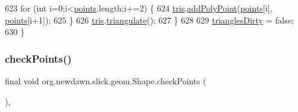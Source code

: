 \begin{DoxyCode}
623             \textcolor{keywordflow}{for} (\textcolor{keywordtype}{int} i=0;i<\mbox{\hyperlink{classorg_1_1newdawn_1_1slick_1_1geom_1_1_shape_a8b4d4058734bbb3b96072e470b92aa37}{points}}.length;i+=2) \{
624                 \mbox{\hyperlink{classorg_1_1newdawn_1_1slick_1_1geom_1_1_shape_abd907aa2c7a270db435ed15ce6d090da}{tris}}.\mbox{\hyperlink{interfaceorg_1_1newdawn_1_1slick_1_1geom_1_1_triangulator_a32b11eccb582c7f4993a944df0b1db65}{addPolyPoint}}(\mbox{\hyperlink{classorg_1_1newdawn_1_1slick_1_1geom_1_1_shape_a8b4d4058734bbb3b96072e470b92aa37}{points}}[i], \mbox{\hyperlink{classorg_1_1newdawn_1_1slick_1_1geom_1_1_shape_a8b4d4058734bbb3b96072e470b92aa37}{points}}[i+1]);
625             \}
626             \mbox{\hyperlink{classorg_1_1newdawn_1_1slick_1_1geom_1_1_shape_abd907aa2c7a270db435ed15ce6d090da}{tris}}.\mbox{\hyperlink{interfaceorg_1_1newdawn_1_1slick_1_1geom_1_1_triangulator_a7c7ce8f59679b6c759a1e3d15ec4ee92}{triangulate}}();
627         \}
628         
629         \mbox{\hyperlink{classorg_1_1newdawn_1_1slick_1_1geom_1_1_shape_a9300b64ed3c260451f38151305e7c85e}{trianglesDirty}} = \textcolor{keyword}{false};
630     \}
\end{DoxyCode}
\mbox{\label{classorg_1_1newdawn_1_1slick_1_1geom_1_1_shape_a84293802d05e8666a441720bfc12745d}} 
\subsubsection{\texorpdfstring{check\+Points()}{checkPoints()}}
{\footnotesize\ttfamily final void org.\+newdawn.\+slick.\+geom.\+Shape.\+check\+Points (\begin{DoxyParamCaption}{ }\end{DoxyParamCaption})\hspace{0.3cm}{\ttfamily [inline]}, {\ttfamily [protected]}}

